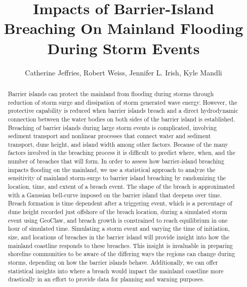 \documentclass{coastal_paper}
\title{Impacts of Barrier-Island Breaching On Mainland Flooding During Storm Events}
\author{Catherine Jeffries, Robert Weiss, Jennifer L. Irish, Kyle Mandli}
\begin{document}
\maketitle
\begin{abstract}
Barrier islands can protect the mainland from flooding during storms through reduction of storm surge and dissipation of storm generated wave energy. However, the protective capability is reduced when barrier islands breach and a direct hydrodynamic connection between the water bodies on both sides of the barrier island is established. Breaching of barrier islands during large storm events is complicated, involving sediment transport and nonlinear processes that connect water and sediment transport, dune height, and island width among other factors. Because of the many factors involved in the breaching process it is difficult to predict where, when, and the number of breaches that will form. In order to assess how barrier-island breaching impacts flooding on the mainland, we use a statistical approach to analyze the sensitivity of mainland storm-surge  to barrier island breaching by randomizing the location, time, and extent of a breach event. The shape of the breach is approximated with a Gaussian bell-curve imposed on the barrier island that deepens over time. Breach formation is time dependent after a triggering event, which is a percentage of dune height recorded just offshore of the breach location, during a simulated storm event using GeoClaw, and breach growth is constrained to reach equilibrium in one hour of simulated time. Simulating a storm event and varying the time of initiation, size, and locations of breaches in the barrier island will provide insight into how the mainland coastline responds to these breaches. This insight is invaluable in preparing shoreline communities to be aware of the differing ways the regions can change during storms, depending on how the barrier islands behave. Additionally, we can offer statistical insights into where a breach would impact the mainland coastline more drastically in an effort to provide data for planning and warning purposes.    
\end{abstract}
\newpage

\linenumbers
\end{document}
